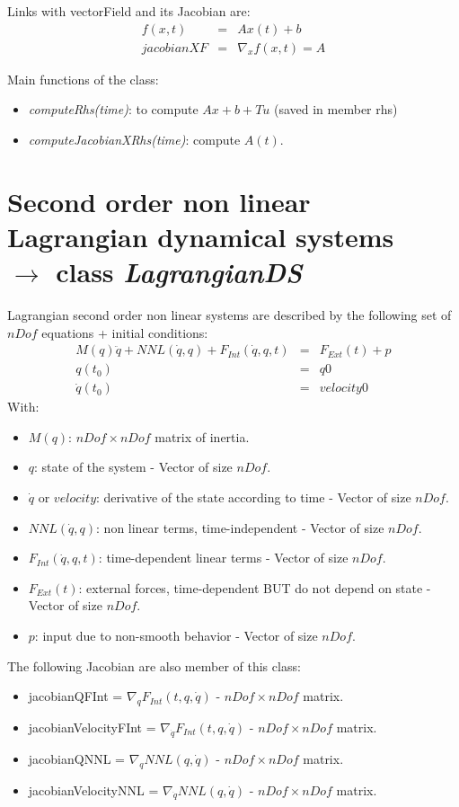\documentclass[10pt]{article}
\begin{document}
Links with vectorField and its Jacobian are: 
\begin{eqnarray}
  f(x,t) &=& Ax(t)+b \\
  jacobianXF&=&\nabla_x f(x,t) = A
\end{eqnarray}

Main functions of the class:
\begin{itemize}
\item \textit{computeRhs(time)}: to compute $Ax+b+Tu$ (saved in member rhs)
\item \textit{computeJacobianXRhs(time)}: compute $A(t)$.
\end{itemize}

\section{Second order non linear Lagrangian dynamical systems \\  $\rightarrow$ class \textit{LagrangianDS}}

Lagrangian second order non linear systems are described by the following set of $nDof$ equations + initial conditions:
\begin{eqnarray}
 M(q) \ddot q + NNL(\dot q, q) + F_{Int}(\dot q , q , t) &=& F_{Ext}(t) + p \\
 q(t_0) &=& q0 \\
 \dot q(t_0) &=& velocity0 
\end{eqnarray}
With:
\begin{itemize}
\item $M(q)$: $nDof\times nDof$ matrix of inertia.
\item $q$: state of the system - Vector of size $nDof$.
\item $\dot q$ or $velocity$: derivative of the state according to time - Vector of size $nDof$.
\item $NNL(\dot q, q)$:  non linear terms, time-independent - Vector of size $nDof$.
\item $F_{Int}(\dot q , q , t)$: time-dependent linear terms - Vector of size $nDof$.
\item $F_{Ext}(t)$: external forces, time-dependent BUT do not depend on state - Vector of size $nDof$.
\item $p$: input due to non-smooth behavior - Vector of size $nDof$.
\end{itemize}

The following Jacobian are also member of this class:
\begin{itemize}
\item jacobianQFInt = $\nabla_q F_{Int}(t,q,\dot q)$ - $nDof\times nDof$ matrix.
\item jacobianVelocityFInt = $\nabla_{\dot q} F_{Int}(t,q,\dot q)$ - $nDof\times nDof$ matrix.
\item jacobianQNNL = $\nabla_q NNL(q,\dot q)$ - $nDof\times nDof$ matrix.
\item jacobianVelocityNNL = $\nabla_{\dot q}NNL(q,\dot q)$ - $nDof\times nDof$ matrix.
\end{itemize}
\end{document}
